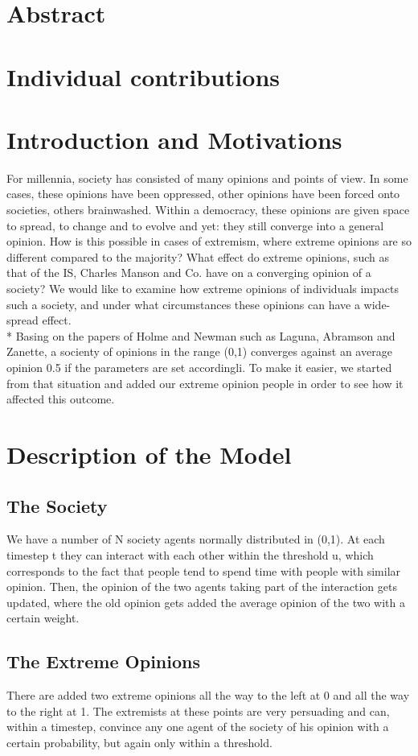 \documentclass[11pt]{article}
\begin{document}
\section{Abstract}

\section{Individual contributions}

\section{Introduction and Motivations}
For millennia, society has consisted of many opinions and points of view. In some cases, these opinions have been oppressed, other opinions have been forced onto societies, others brainwashed. Within a democracy, these opinions are given space to spread, to change and to evolve and yet: they still converge into a general opinion. How is this possible in cases of extremism, where extreme opinions are so different compared to the majority? What effect do extreme opinions, such as that of the IS, Charles Manson and Co. have on a converging opinion of a society? We would like to examine how extreme opinions of individuals impacts such a society, and under what circumstances these opinions can have a wide-spread effect. \\*
Basing on the papers of Holme and Newman such as  Laguna, Abramson and Zanette, a socienty of opinions in the range (0,1) converges against an average opinion 0.5 if the parameters are set accordingli. To make it easier, we started from that situation and added our extreme opinion people in order to see how it affected this outcome.

\section{Description of the Model}
\subsection{The Society}
We have a number of N society agents normally distributed in (0,1). At each timestep t they can interact with each other within the threshold u, which corresponds to the fact that people tend to spend time with people with similar opinion. Then, the opinion of the two agents taking part of the interaction gets updated, where the old opinion gets added the average opinion of the two with a certain weight.
\subsection{The Extreme Opinions}
There are added two extreme opinions all the way to the left at 0 and all the way to the right at 1. The extremists at these points are very persuading and can, within a timestep, convince any one agent of the society of his opinion with a certain probability, but again only within a threshold.
\end{document}
